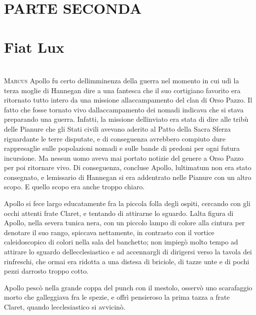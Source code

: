 	{ \chapter*{PARTE SECONDA\\\leavevmode\\\footnotesize{Fiat Lux}}}
		\chapter{\phantom{text}}
	
	\lettrine{M}{arcus} Apollo fu certo dell\textquotesingle imminenza della guerra nel
	momento in cui udì la terza moglie di Hannegan dire a una fantesca che
	il suo cortigiano favorito era ritornato tutto intero da una missione
	all\textquotesingle accampamento del clan di Orso Pazzo. Il fatto che
	fosse tornato vivo dall\textquotesingle accampamento dei nomadi indicava
	che si stava preparando una guerra. Infatti, la missione
	dell\textquotesingle inviato era stata di dire alle tribù delle Pianure
	che gli Stati civili avevano aderito al Patto della Sacra Sferza
	riguardante le terre disputate, e di conseguenza avrebbero compiuto dure
	rappresaglie sulle popolazioni nomadi e sulle bande di predoni per ogni
	futura incursione. Ma nessun uomo aveva mai portato notizie del genere a
	Orso Pazzo per poi ritornare vivo. Di conseguenza, concluse Apollo,
	l\textquotesingle ultimatum non era stato consegnato, e
	l\textquotesingle emissario di Hannegan si era addentrato nelle Pianure
	con un altro scopo. E quello scopo era anche troppo chiaro.
	
	Apollo si fece largo educatamente fra la piccola folla degli ospiti,
	cercando con gli occhi attenti frate Claret, e tentando di attirarne lo
	sguardo. L\textquotesingle alta figura di Apollo, nella severa tunica
	nera, con un piccolo lampo di colore alla cintura per denotare il suo
	rango, spiccava nettamente, in contrasto con il vortice caleidoscopico
	di colori nella sala del banchetto; non impiegò molto tempo ad attirare
	lo sguardo dell\textquotesingle ecclesiastico e ad accennargli di
	dirigersi verso la tavola dei rinfreschi, che ormai era ridotta a una
	distesa di briciole, di tazze unte e di pochi pezzi
	d\textquotesingle arrosto troppo cotto.
	
	Apollo pescò nella grande coppa del punch con il mestolo, osservò uno
	scarafaggio morto che galleggiava fra le spezie, e offrì pensieroso la
	prima tazza a frate Claret, quando l\textquotesingle ecclesiastico si
	avvicinò.
	
